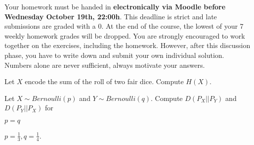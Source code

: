 \documentclass[a4paper,10pt,landscape,twocolumn]{scrartcl}
\newcommand\deadline{Wednesday October 19th, 22:00h}
\begin{document}
\homeworkproblems

{\sffamily\noindent
Your homework must be handed in \textbf{electronically via Moodle before \deadline}.  This deadline is strict and late submissions are graded with a 0. At the end of the course, the lowest of your 7 weekly homework grades will be dropped. You are strongly encouraged to work together on the exercises, including the homework. However, after this discussion phase, you have to write down and submit your own individual solution. Numbers alone are never sufficient, always motivate your answers.
}


\begin{exercise}
Let $X$ encode the sum of the roll of two fair dice. Compute $H(X)$.
\end{exercise}

\begin{exercise}
Let $X \sim Bernoulli(p)$ and $Y \sim Bernoulli(q)$. Compute $D(P_X || P_Y)$ and $D(P_Y || P_X)$ for 

\begin{subex}
$p=q$
\end{subex}

\begin{subex}
$p=\frac 1 3, q=\frac 1 4$.
\end{subex}

\end{exercise}
\end{document}

